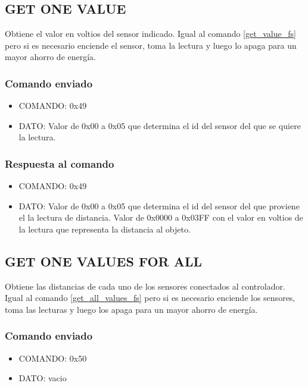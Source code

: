 \documentclass[a4paper,10pt]{article}
\begin{document}
\subsection{GET ONE VALUE}
\label{get_one_value_fs}

Obtiene el valor en voltios del sensor indicado.
Igual al comando \ref{get_value_fs} pero si es necesario enciende el sensor, toma la lectura y luego lo apaga para un mayor ahorro de energ\'ia.

\subsubsection*{Comando enviado}

\begin{itemize}
	\item{COMANDO:} 0x49
	\item{DATO:} Valor de 0x00 a 0x05 que determina el id del sensor del que se quiere la lectura.
\end{itemize}

\subsubsection*{Respuesta al comando}

\begin{itemize}
	\item{COMANDO:} 0x49
	\item{DATO:} Valor de 0x00 a 0x05 que determina el id del sensor del que proviene el la lectura de distancia.
	Valor de 0x0000 a 0x03FF con el valor en voltios de la lectura que representa la distancia al objeto.
\end{itemize}

\subsection{GET ONE VALUES FOR ALL}
\label{get_one_values_for_all_fs}

Obtiene las distancias de cada uno de los sensores conectados al controlador.
Igual al comando \ref{get_all_values_fs} pero si es necesario enciende los sensores, toma las lecturas y luego los apaga para un mayor ahorro de energ\'ia.

\subsubsection*{Comando enviado}

\begin{itemize}
	\item{COMANDO:} 0x50
	\item{DATO:} vacio
\end{itemize}
\end{document}
